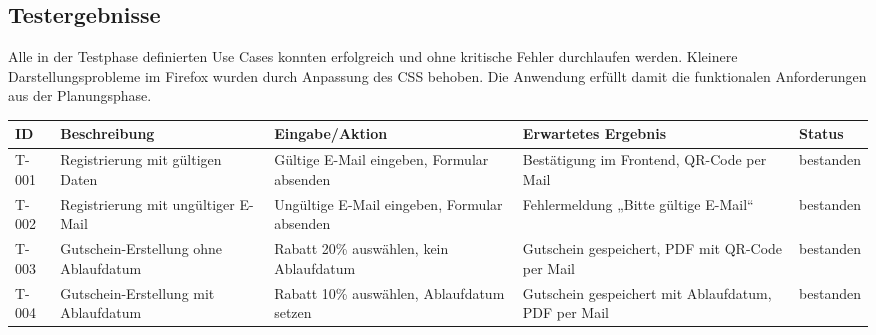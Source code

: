 \subsection{Testergebnisse}
\label{sec:Testergebnisse1}
Alle in der Testphase definierten Use Cases konnten erfolgreich und ohne kritische Fehler durchlaufen werden.
Kleinere Darstellungsprobleme im Firefox wurden durch Anpassung des CSS behoben.
Die Anwendung erfüllt damit die funktionalen Anforderungen aus der Planungsphase.

\begin{center}
  \label{tab:testergebnisse1}
  \begin{tabularx}{\textwidth}{|L{1.2cm}|X|L{3.2cm}|L{3.2cm}|L{1.6cm}|}
    \hline
    \textbf{ID} & \textbf{Beschreibung}                 & \textbf{Eingabe/Aktion}                      & \textbf{Erwartetes Ergebnis}                        & \textbf{Status} \\
    \hline
    T-001       & Registrierung mit gültigen Daten      & Gültige E-Mail eingeben, Formular absenden   & Bestätigung im Frontend, QR-Code per Mail           & bestanden       \\
    \hline
    T-002       & Registrierung mit ungültiger E-Mail   & Ungültige E-Mail eingeben, Formular absenden & Fehlermeldung „Bitte gültige E-Mail“                & bestanden       \\
    \hline
    T-003       & Gutschein-Erstellung ohne Ablaufdatum & Rabatt 20\% auswählen, kein Ablaufdatum      & Gutschein gespeichert, PDF mit QR-Code per Mail     & bestanden       \\
    \hline
    T-004       & Gutschein-Erstellung mit Ablaufdatum  & Rabatt 10\% auswählen, Ablaufdatum setzen    & Gutschein gespeichert mit Ablaufdatum, PDF per Mail & bestanden       \\
    \hline
  \end{tabularx}
\end{center}

\newpage

